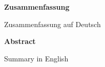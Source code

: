 \begin{center}
  \begin{large}
  \bfseries{Zusammenfassung}
  \end{large}
\end{center}
Zusammenfassung auf Deutsch
\par\bigskip
\par\bigskip
{}
\begin{center}
  \begin{large}
  \bfseries{Abstract}
  \end{large}
\end{center}
Summary in English
